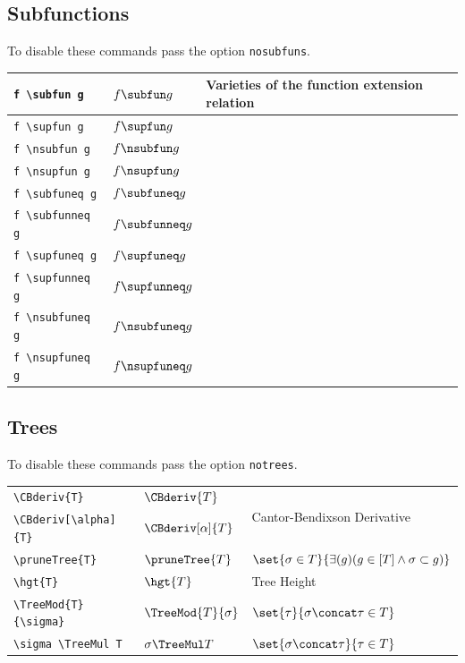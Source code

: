 \documentclass[leqno,11pt]{amsart}
\begin{document}
\subsection{Subfunctions}
To disable these commands pass the option \verb=nosubfuns=.\\

\begin{tabular}{l |  l | l}\toprule
	\verb=f \subfun g=		       & \( f \subfun g \) & Varieties of the function extension relation      \\	\midrule
	\verb=f \supfun g=		       & \( f \supfun g \) &  \\ 	\midrule
	\verb=f \nsubfun g=		       & \( f \nsubfun g \) & \\	\midrule
\verb=f \nsupfun g=		       & \( f \nsupfun g \) & \\	\midrule
	\verb=f \subfuneq g=		       & \( f \subfuneq g \) & \\	\midrule
		\verb=f \subfunneq g=		       & \( f \subfunneq g \) & \\	\midrule
	\verb=f \supfuneq g=		       & \( f \supfuneq g \) &  \\ 	\midrule
		\verb=f \supfunneq g=		       & \( f \supfunneq g \) &  \\ 	\midrule
	\verb=f \nsubfuneq g=		       & \( f \nsubfuneq g \) & \\	\midrule
\verb=f \nsupfuneq g=		       & \( f \nsupfuneq g \) & \\	\midrule
		\bottomrule
	\end{tabular}

\subsection{Trees}
To disable these commands pass the option \verb=notrees=.\\

\begin{tabular}{l |  l | l}\toprule
	\verb=\CBderiv{T}=		      & \(  \CBderiv{T}		      \) & \multirow{2}{*}{Cantor-Bendixson Derivative} \\[6pt]
	\verb=\CBderiv[\alpha]{T}=           & \(  \CBderiv[\alpha]{T}       \) & \\ \midrule
	\verb=\pruneTree{T}=                 & \(  \pruneTree{T}             \) & \( \set{\sigma \in T}{\exists(g)(g \in [T] \land \sigma \subset g)} \) \\ \midrule
	\verb=\hgt{T}=                       & \(  \hgt{T}                   \) & Tree Height \\ \midrule
	\verb=\TreeMod{T}{\sigma}=                       & \(  \TreeMod{T}{\sigma}                  \) & \(  \set{\tau}{\sigma\concat\tau \in T} \)   \\ \midrule
	\verb=\sigma \TreeMul T=                       & \(  \sigma \TreeMul T               \) & \(  \set{\sigma\concat\tau}{\tau \in T} \) \\
		\bottomrule
	\end{tabular}
\end{document}
